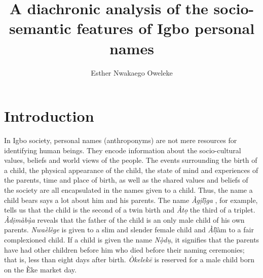 \documentclass[output=paper]{langscibook}
\title[A diachronic analysis of the socio-semantic features of Igbo names]
      {A diachronic analysis of the socio-semantic features of Igbo personal names}
\author{Esther Nwakaego Oweleke\affiliation{Department of Linguistics and Communication Studies, University of Port Harcourt}}
\begin{document}
\maketitle


\section{Introduction}

In Igbo society, personal names (anthroponyms) are not mere resources for identifying human beings. They encode information about the socio-cultural values, beliefs and world views of the people. The events surrounding the birth of a child, the physical appearance of the child, the state of mind and experiences of the parents, time and place of birth, as well as the shared values and beliefs of the society are all encapsulated in the names given to a child. Thus, the name a child bears says a lot about him and his parents. The name \textit{Àgịlị̀ga }, for example, tells us that the child is the second of a twin birth and \textit{Àto}̣ the third of a triplet. \textit{Àdịmàbụ̀a} reveals that the father of the child is an only male child of his own parents. \textit{Nwaèlège} is given to a slim and slender female child and \textit{Àlị̀}àm to a fair complexioned child. If a child is given the name \textit{Nọ̀du}̣, it signifies that the parents have had other children before him who died before their naming ceremonies; that is, less than eight days after birth. \textit{Òkelekē} is reserved for a male child born on the Èke market day. 
\end{document}
